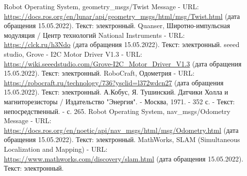 \documentclass[12pt,a4paper]{scrartcl}
\begin{document}
\begin{thebibliography}{9}
		 Robot Operating System, geometry\_msgs/Twist Message - URL: \url{https://docs.ros.org/en/lunar/api/geometry_msgs/html/msg/Twist.html} (дата обращения 15.05.2022). Текст: электронный.
		 Quanser, Широтно-импульсная модуляция / Центр технологий National Instruments - URL: \url{https://clck.ru/h3Ndo} (дата обращения 15.05.2022). Текст: электронный.
		 seeed studio, Grove - I2C Motor Driver V1.3 - URL: \url{https://wiki.seeedstudio.com/Grove-I2C_Motor_Driver_V1.3} (дата обращения 15.05.2022). Текст: электронный.
		 RoboCraft, Одометрия - URL: \url{https://robocraft.ru/technology/736?ysclid=l372wdcn27} (дата обращения 15.05.2022). Текст: электронный.
		 А.Кобус, Я. Тушинский. Датчики Холла и магниторезисторы / Издательство "Энергия". - Москва, 1971. - 352 с. - Текст: непосредственный. - с. 265.
		 Robot Operating System, nav\_msgs/Odometry Message - URL: \url{https://docs.ros.org/en/noetic/api/nav_msgs/html/msg/Odometry.html} (дата обращения 15.05.2022). Текст: электронный.
		 MathWorks, SLAM (Simultaneous Localization and Mapping) - URL: \url{https://www.mathworks.com/discovery/slam.html} (дата обращения 15.05.2022). Текст: электронный.
	\end{thebibliography}
			
	
\end{document}
